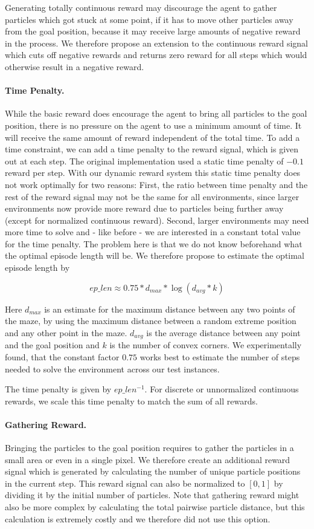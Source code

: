 Generating totally continuous reward may discourage the agent to gather particles which got stuck at some point, if it has to move other particles away from the goal position, because it may receive large amounts of negative reward in the process. We therefore propose an extension to the continuous reward signal which cuts off negative rewards and returns zero reward for all steps which would otherwise result in a negative reward.

\paragraph{Time Penalty.}
While the basic reward does encourage the agent to bring all particles to the goal position, there is no pressure on the agent to use a minimum amount of time. It will receive the same amount of reward independent of the total time. To add a time constraint, we can add a time penalty to the reward signal, which is given out at each step. The original implementation used a static time penalty of $-0.1$ reward per step. With our dynamic reward system this static time penalty does not work optimally for two reasons: First, the ratio between time penalty and the rest of the reward signal may not be the same for all environments, since larger environments now provide more reward due to particles being further away (except for normalized continuous reward). Second, larger environments may need more time to solve and - like before - we are interested in a constant total value for the time penalty. The problem here is that we do not know beforehand what the optimal episode length will be. We therefore propose to estimate the optimal episode length by

\[ep\_len \approx 0.75 * d_{max} * \log (d_{avg} * k)\]

Here $d_{max}$ is an estimate for the maximum distance between any two points of the maze, by using the maximum distance between a random extreme position and any other point in the maze. $d_{avg}$ is the average distance between any point and the goal position and $k$ is the number of convex corners. We experimentally found, that the constant factor $0.75$ works best to estimate the number of steps needed to solve the environment across our test instances.

The time penalty is given by $ep\_len^{-1}$. For discrete or unnormalized continuous rewards, we scale this time penalty to match the sum of all rewards. 

\paragraph{Gathering Reward.}
Bringing the particles to the goal position requires to gather the particles in a small area or even in a single pixel. We therefore create an additional reward signal which is generated by calculating the number of unique particle positions in the current step. This reward signal can also be normalized to $[0, 1]$ by dividing it by the initial number of particles. Note that gathering reward might also be more complex by calculating the total pairwise particle distance, but this calculation is extremely costly and we therefore did not use this option.

